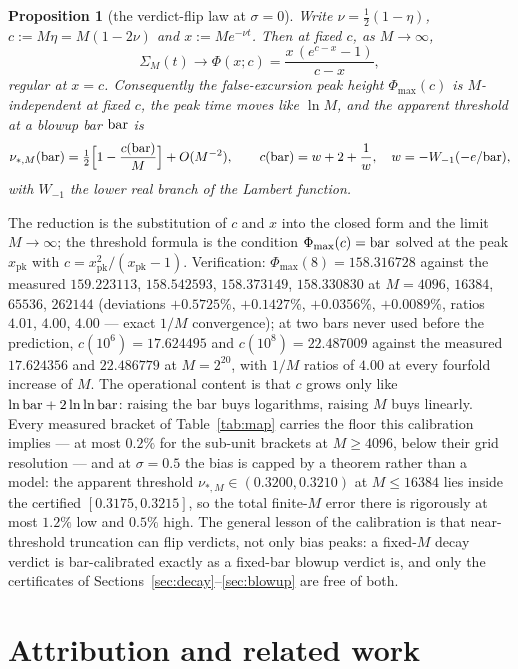 \documentclass[11pt,a4paper]{article}
\theoremstyle{plain}
\newtheorem{proposition}[theorem]{Proposition}
\theoremstyle{definition}
\newcommand{\pk}{\mathrm{pk}}
\begin{document}
\begin{proposition}[the verdict-flip law at $\sigma=0$]\label{prop:flip}
Write $\nu=\tfrac12(1-\eta)$, $c:=M\eta=M(1-2\nu)$ and $x:=Me^{-\nu t}$. Then at fixed $c$, as $M\to\infty$,
\[
\Sigma_M(t)\to\Phi(x;c)=\frac{x\,(e^{c-x}-1)}{c-x},
\]
regular at $x=c$. Consequently the false-excursion peak height $\Phi_{\max}(c)$ is $M$-independent at fixed $c$, the peak time moves like $\ln M$, and the apparent threshold at a blowup bar ${\rm bar}$ is
\[
\nu_{*,M}({\rm bar})=\tfrac12\Big[1-\frac{c({\rm bar})}{M}\Big]+O(M^{-2}),\qquad c({\rm bar})=w+2+\frac1w,\quad w=-W_{-1}(-e/{\rm bar}),
\]
with $W_{-1}$ the lower real branch of the Lambert function.
\end{proposition}
The reduction is the substitution of $c$ and $x$ into the closed form and the limit $M\to\infty$; the threshold formula is the condition $\Phi_{\max}(c)={\rm bar}$ solved at the peak $x_{\pk}$ with $c=x_{\pk}^2/(x_{\pk}-1)$. Verification: $\Phi_{\max}(8)=158.316728$ against the measured $159.223113$, $158.542593$, $158.373149$, $158.330830$ at $M=4096$, $16384$, $65536$, $262144$ (deviations $+0.5725\%$, $+0.1427\%$, $+0.0356\%$, $+0.0089\%$, ratios $4.01$, $4.00$, $4.00$ --- exact $1/M$ convergence); at two bars never used before the prediction, $c(10^6)=17.624495$ and $c(10^8)=22.487009$ against the measured $17.624356$ and $22.486779$ at $M=2^{20}$, with $1/M$ ratios of $4.00$ at every fourfold increase of $M$. The operational content is that $c$ grows only like $\ln{\rm bar}+2\ln\ln{\rm bar}$: raising the bar buys logarithms, raising $M$ buys linearly. Every measured bracket of Table~\ref{tab:map} carries the floor this calibration implies --- at most $0.2\%$ for the sub-unit brackets at $M\ge4096$, below their grid resolution --- and at $\sigma=0.5$ the bias is capped by a theorem rather than a model: the apparent threshold $\nu_{*,M}\in(0.3200,0.3210)$ at $M\le16384$ lies inside the certified $[0.3175,0.3215]$, so the total finite-$M$ error there is rigorously at most $1.2\%$ low and $0.5\%$ high. The general lesson of the calibration is that near-threshold truncation can flip verdicts, not only bias peaks: a fixed-$M$ decay verdict is bar-calibrated exactly as a fixed-bar blowup verdict is, and only the certificates of Sections~\ref{sec:decay}--\ref{sec:blowup} are free of both.

\section{Attribution and related work}\label{sec:related}
\end{document}
